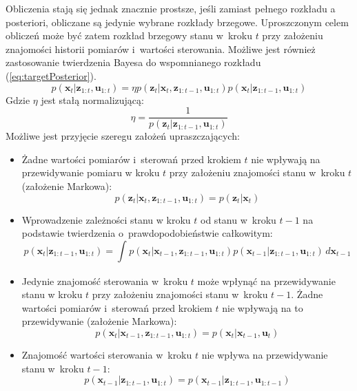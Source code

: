 \par Obliczenia stają się jednak znacznie prostsze, jeśli zamiast pełnego rozkładu a posteriori, obliczane są jedynie wybrane rozkłady brzegowe. \cite[10]{Sarka}
Uproszczonym celem obliczeń może być zatem rozkład brzegowy stanu w~kroku $t$ przy założeniu znajomości historii pomiarów i~wartości sterowania. Możliwe jest również zastosowanie twierdzenia Bayesa do wspomnianego rozkładu 
 (\ref{eq:targetPosterior}).
\begin{equation} \label{eq:targetPosterior}
	p(\boldsymbol{x}_t|\boldsymbol{z}_{1:t},\boldsymbol{u}_{1:t})=\eta p(\boldsymbol{z}_t|\boldsymbol{x}_t,\boldsymbol{z}_{1:t-1},\boldsymbol{u}_{1:t})p(\boldsymbol{x}_t|\boldsymbol{z}_{1:t-1},\boldsymbol{u}_{1:t})
\end{equation}
Gdzie $\eta$ jest stałą normalizującą: $$\eta=\frac{1}{p(\boldsymbol{z}_t|\boldsymbol{z}_{1:t-1},\boldsymbol{u}_{1:t})}$$
Możliwe jest przyjęcie szeregu założeń upraszczających: \cite[28-29]{Thrun}
\begin{itemize}
	\item Żadne wartości pomiarów i~sterowań przed krokiem $t$ nie wpływają na przewidywanie pomiaru w kroku $t$ przy założeniu znajomości stanu w~kroku $t$ (założenie Markowa):
	\begin{equation} \label{eq:markovAssumption1}
	p(\boldsymbol{z}_t|\boldsymbol{x}_t,\boldsymbol{z}_{1:t-1},\boldsymbol{u}_{1:t})=p(\boldsymbol{z}_t|\boldsymbol{x}_t)
	\end{equation}
	\item Wprowadzenie zależności stanu w kroku $t$ od stanu w~kroku $t-1$ na podstawie twierdzenia o~prawdopodobieństwie całkowitym:
	\begin{equation} \label{eq:totalProbability}
	p(\boldsymbol{x}_t|\boldsymbol{z}_{1:t-1},\boldsymbol{u}_{1:t})=\int_{}^{}p(\boldsymbol{x}_t|\boldsymbol{x}_{t-1},\boldsymbol{z}_{1:t-1},\boldsymbol{u}_{1:t})p(\boldsymbol{x}_{t-1}|\boldsymbol{z}_{1:t-1},\boldsymbol{u}_{1:t}) \,d\boldsymbol{x}_{t-1}
	\end{equation}
	\item Jedynie znajomość sterowania w~kroku $t$ może wpłynąć na przewidywanie stanu w kroku $t$ przy założeniu znajomości stanu w~kroku $t-1$. Żadne wartości pomiarów i~sterowań przed krokiem $t$ nie wpływają na to przewidywanie (założenie Markowa):
	\begin{equation} \label{eq:markovAssumption2}
	p(\boldsymbol{x}_t|\boldsymbol{x}_{t-1},\boldsymbol{z}_{1:t-1},\boldsymbol{u}_{1:t})=p(\boldsymbol{x}_t|\boldsymbol{x}_{t-1},\boldsymbol{u}_t)
	\end{equation}
	\item Znajomość wartości sterowania w~kroku $t$ nie wpływa na przewidywanie stanu w~kroku $t-1$:
	\begin{equation} \label{eq:independenceAssumption}
	p(\boldsymbol{x}_{t-1}|\boldsymbol{z}_{1:t-1},\boldsymbol{u}_{1:t})=p(\boldsymbol{x}_{t-1}|\boldsymbol{z}_{1:t-1},\boldsymbol{u}_{1:t-1})
	\end{equation}
\end{itemize}
